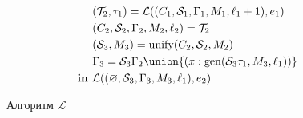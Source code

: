 \begin{figure}[H]
{\begin{minipage}[c][\textheight-2\fboxsep-2\fboxrule-1cm][c]{\dimexpr\textwidth-2\fboxsep-2\fboxrule}
\begin{alignat*}{4}
      & && & &(\mathcal{T}_2, \tau_1) = \mathcal{L}((C_1, \mathcal{S}_1, \Gamma_1, M_1, \ell_1 + 1), e_1)\\
      & && & &(C_2, \mathcal{S}_2, \Gamma_2, M_2, \ell_2) = \mathcal{T}_2\\
      & && & &(\mathcal{S}_3, M_3) = \mathrm{unify}(C_2, \mathcal{S}_2, M_2)\\
      & && & &\Gamma_3 = \mathcal{S}_3\Gamma_2 \union \{(x:\mathrm{gen}(\mathcal{S}_3 \tau_1, M_3, \ell_1))\}\\
      & && &\textbf{in } &\mathcal{L}((\varnothing, \mathcal{S}_3, \Gamma_3, M_3, \ell_1), e_2) \\
    \end{alignat*}
  \end{minipage}}
  \caption{Алгоритм $\mathcal{L}$}\label{fig:algorithm-L}
\end{figure}

